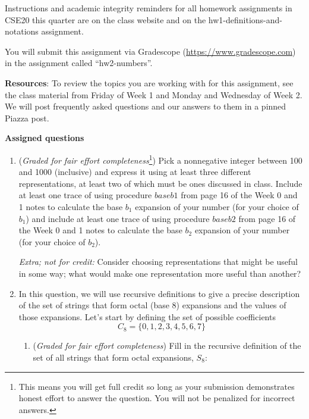 Instructions and academic integrity reminders for all homework assignments in 
CSE20 this quarter are on the class website and on the hw1-definitions-and-notations
assignment.


You will submit this assignment via Gradescope
(\href{https://www.gradescope.com}{https://www.gradescope.com}) 
in the assignment called ``hw2-numbers''.


{\bf Resources}: To review the topics you are working with 
for this assignment, see the class material from Friday of Week 1 and Monday
 and Wednesday of Week 2.
We will post frequently asked questions and our answers to them in a 
pinned Piazza post.

{\bf Assigned questions}

\begin{enumerate}
    \item ({\it Graded for fair effort completeness}\footnote{This means 
    you will get full credit so long as your submission demonstrates honest 
    effort to answer the question. You will not be penalized for incorrect answers.})
    Pick a nonnegative integer between 100 and 1000 (inclusive) and express it using at 
    least three different representations, 
    at least two of which must be ones discussed in class. Include at least one
    trace of using procedure $baseb1$ from page 16 of the Week 0 and 1 notes
    to calculate the base $b_1$ expansion of your
    number (for your choice of $b_1$) and include at least one trace of using 
    procedure $baseb2$ from page 16 of the Week 0 and 1 notes
    to calculate the base $b_2$ expansion of your number
    (for your choice of $b_2$). 
    
    {\it Extra; not for credit:} Consider choosing representations that might be useful in 
    some way; what would make one representation more useful than another?

    \newpage
    \item In this question, we will use recursive definitions to give a precise description 
    of the set of strings that form octal (base $8$) expansions and the values
    of those expansions. Let's start by defining the set of possible coefficients
    \[
        C_8 = \{ 0, 1, 2, 3, 4, 5, 6, 7\}
    \]

    \begin{enumerate}
    \item ({\it Graded for fair effort completeness}) Fill in the recursive definition of the 
    set of all strings that form octal expansions, $S_8$: 
    

\end{enumerate}
\end{enumerate}
